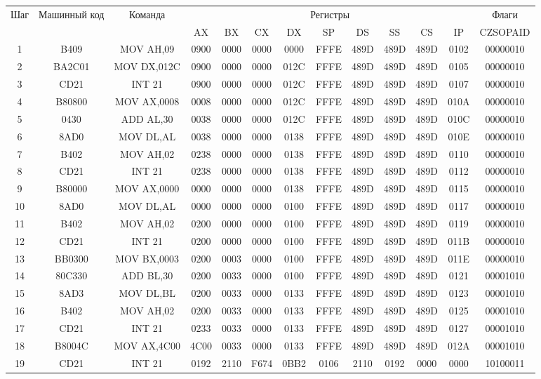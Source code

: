 \begin{tabular}{|c|c|c|c|c|c|c|c|c|c|c|c|c|}
\hline
	Шаг & Машинный код & Команда & \multicolumn{9}{|c|}{Регистры} & Флаги \\
	& & & AX & BX & CX & DX & SP & DS & SS & CS & IP & CZSOPAID \\
\hline
	1 & B409 & MOV AH,09 & 0900 & 0000 & 0000 & 0000 & FFFE & 489D & 489D & 489D & 0102 & 00000010 \\
\hline
	2 & BA2C01 & MOV DX,012C & 0900 & 0000 & 0000 & 012C & FFFE & 489D & 489D & 489D & 0105 & 00000010 \\
\hline
	3 & CD21 & INT 21 & 0900 & 0000 & 0000 & 012C & FFFE & 489D & 489D & 489D & 0107 & 00000010 \\
\hline
	4 & B80800 & MOV AX,0008 & 0008 & 0000 & 0000 & 012C & FFFE & 489D & 489D & 489D & 010A & 00000010 \\
\hline
	5 & 0430 & ADD AL,30 & 0038 & 0000 & 0000 & 012C & FFFE & 489D & 489D & 489D & 010C & 00000010 \\
\hline
	6 & 8AD0 & MOV DL,AL & 0038 & 0000 & 0000 & 0138 & FFFE & 489D & 489D & 489D & 010E & 00000010 \\
\hline
	7 & B402 & MOV AH,02 & 0238 & 0000 & 0000 & 0138 & FFFE & 489D & 489D & 489D & 0110 & 00000010 \\
\hline
	8 & CD21 & INT 21 & 0238 & 0000 & 0000 & 0138 & FFFE & 489D & 489D & 489D & 0112 & 00000010 \\
\hline
	9 & B80000 & MOV AX,0000 & 0000 & 0000 & 0000 & 0138 & FFFE & 489D & 489D & 489D & 0115 & 00000010 \\
\hline
	10 & 8AD0 & MOV DL,AL & 0000 & 0000 & 0000 & 0100 & FFFE & 489D & 489D & 489D & 0117 & 00000010 \\
\hline
	11 & B402 & MOV AH,02 & 0200 & 0000 & 0000 & 0100 & FFFE & 489D & 489D & 489D & 0119 & 00000010 \\
\hline
	12 & CD21 & INT 21 & 0200 & 0000 & 0000 & 0100 & FFFE & 489D & 489D & 489D & 011B & 00000010 \\
\hline
	13 & BB0300 & MOV BX,0003 & 0200 & 0003 & 0000 & 0100 & FFFE & 489D & 489D & 489D & 011E & 00000010 \\
\hline
	14 & 80C330 & ADD BL,30 & 0200 & 0033 & 0000 & 0100 & FFFE & 489D & 489D & 489D & 0121 & 00001010 \\
\hline
	15 & 8AD3 & MOV DL,BL & 0200 & 0033 & 0000 & 0133 & FFFE & 489D & 489D & 489D & 0123 & 00001010 \\
\hline
	16 & B402 & MOV AH,02 & 0200 & 0033 & 0000 & 0133 & FFFE & 489D & 489D & 489D & 0125 & 00001010 \\
\hline
	17 & CD21 & INT 21 & 0233 & 0033 & 0000 & 0133 & FFFE & 489D & 489D & 489D & 0127 & 00001010 \\
\hline
	18 & B8004C & MOV AX,4C00 & 4C00 & 0033 & 0000 & 0133 & FFFE & 489D & 489D & 489D & 012A & 00001010 \\
\hline
	19 & CD21 & INT 21 & 0192 & 2110 & F674 & 0BB2 & 0106 & 2110 & 0192 & 0000 & 0000 & 10100011 \\
\hline
\end{tabular}
